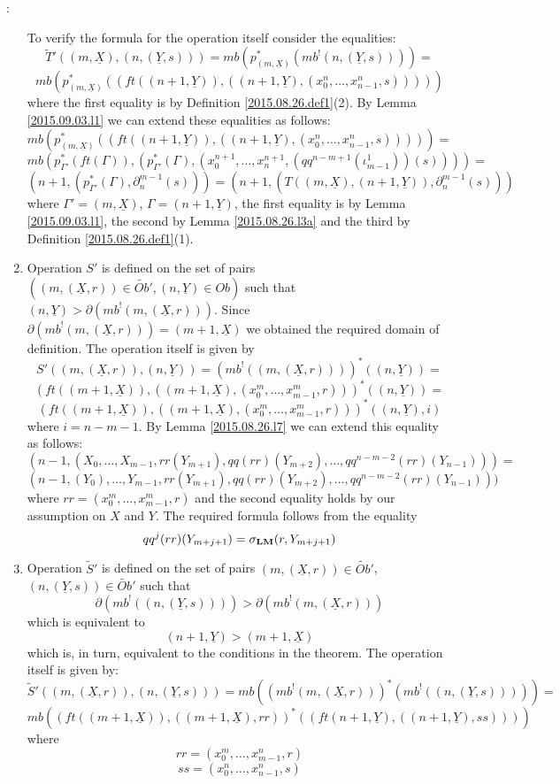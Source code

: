 \documentclass[11pt]{article}
\newenvironment{proof}{{\bf Proof}:}{\vskip 5mm }
\newcommand{\lm}{{\bf LM}}
\newcommand{\uu}{\underline}
\newcommand{\wt}{\widetilde}
\begin{document}
\begin{proof}
\begin{enumerate}
To verify the formula for the operation itself consider the equalities:
%
$$\wt{T}'((m,\uu{X}),(n,(\uu{Y},s)))=mb(p_{(m,\uu{X})}^*(mb^!(n,(\uu{Y},s))))=$$
$$mb(p_{(m,\uu{X})}^*((ft((n+1,\uu{Y})),((n+1,\uu{Y}),(x^{n}_0,\dots,x^{n}_{n-1},s)))))$$
%
where the first equality is by Definition \ref{2015.08.26.def1}(2). By Lemma \ref{2015.09.03.l1} we can extend these equalities as follows:
%
$$mb(p_{(m,\uu{X})}^*((ft((n+1,\uu{Y})),((n+1,\uu{Y}),(x^{n}_0,\dots,x^{n}_{n-1},s)))))=$$
$$mb(p_{\Gamma'}^*(ft(\Gamma)),(p_{\Gamma'}^*(\Gamma),(x^{n+1}_0,\dots,x^{n+1}_{n},(qq^{n-m+1}(\iota^1_{m-1}))(s))))=$$
$$(n+1,(p_{\Gamma'}^*(\Gamma),\partial_{n}^{m-1}(s)))=(n+1,(T((m,\uu{X}),(n+1,\uu{Y})),\partial_n^{m-1}(s)))$$
%
where $\Gamma'=(m,\uu{X})$, $\Gamma=(n+1,\uu{Y})$, the first equality is by Lemma \ref{2015.09.03.l1}, the second by Lemma \ref{2015.08.26.l3a} and the third by Definition \ref{2015.08.26.def1}(1). 
%
%
\item Operation $S'$ is defined on the set of pairs $((m,(\uu{X},r))\in \wt{Ob}',(n,\uu{Y})\in Ob)$ such that $(n,\uu{Y})>\partial(mb^!(m,(\uu{X},r)))$. Since $\partial(mb^!(m,(\uu{X},r)))=(m+1,\uu{X})$ we obtained the required domain of definition. The operation itself is given by
%
$$S'((m,(\uu{X},r)),(n,\uu{Y}))=(mb^!((m,(\uu{X},r))))^*((n,\uu{Y}))=$$
$$(ft((m+1,\uu{X})),((m+1,\uu{X}),(x^{m}_0,\dots,x^{m}_{m-1},r)))^*((n,\uu{Y}))=$$
$$(ft((m+1,\uu{X})),((m+1,\uu{X}),(x^{m}_0,\dots,x^{m}_{m-1},r)))^*((n,\uu{Y}),i)$$
%
where $i=n-m-1$. By Lemma \ref{2015.08.26.l7} we can extend this equality as follows:
%
$$(n-1,(X_0,\dots,X_{m-1},rr(Y_{m+1}),qq(rr)(Y_{m+2}),\dots,qq^{n-m-2}(rr)(Y_{n-1})))=$$
$$(n-1,(Y_0),\dots,Y_{m-1},rr(Y_{m+1}),qq(rr)(Y_{m+2}),\dots,qq^{n-m-2}(rr)(Y_{n-1})))$$
%
where $rr=(x^{m}_0,\dots,x^{m}_{m-1},r)$ and the second equality holds by our assumption on $X$ and $Y$. The required formula follows from the equality 
%
$$qq^j(rr)(Y_{m+j+1})=\sigma_{\lm}(r,Y_{m+j+1})$$
%
\item Operation $\wt{S}'$ is defined on the set of pairs $(m,(\uu{X},r))\in \wt{Ob}'$, $(n,(\uu{Y},s))\in \wt{Ob}'$ such that 
%
$$\partial(mb^!((n,(\uu{Y},s))))>\partial(mb^!(m,(\uu{X},r)))$$
%
which is equivalent to 
%
$$(n+1,\uu{Y})>(m+1,\uu{X})$$
%
which is, in turn, equivalent to the conditions in the theorem. The operation itself is given by:
%
$$\wt{S}'((m,(\uu{X},r)),(n,(\uu{Y},s)))=mb((mb^!(m,(\uu{X},r)))^*(mb^!((n,(\uu{Y},s)))))=$$
$$mb((ft((m+1,\uu{X})),((m+1,\uu{X}),rr))^*((ft(n+1,\uu{Y}),((n+1,\uu{Y}),ss))))$$
%
where
%
$$rr=(x_0^m,\dots,x_{m-1}^n,r)$$
$$ss=(x_0^n,\dots,x_{n-1}^n,s)$$

\end{enumerate}
\end{proof}
\end{document}
